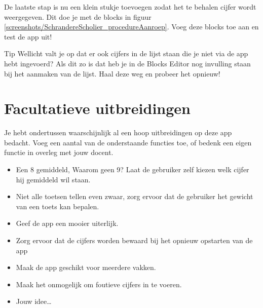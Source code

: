 De laatste stap is nu een klein stukje toevoegen zodat het te behalen cijfer wordt weergegeven. Dit doe je met de blocks in figuur \ref{screenshots/SchrandereScholier_procedureAanroep}. \runOpTelefoon{} Voeg deze blocks toe aan  en test de app uit!

\begin{derivation}{Tip}
Wellicht valt je op dat er ook cijfers in de lijst staan die je niet via de app hebt ingevoerd? Als dit zo is dat heb je in de Blocks Editor nog invulling staan bij het aanmaken van de lijst. Haal deze weg en probeer het opnieuw!
\end{derivation}

\section{Facultatieve uitbreidingen}
Je hebt ondertussen waarschijnlijk al een hoop uitbreidingen op deze app bedacht. Voeg een aantal van de onderstaande functies toe, of bedenk een eigen functie in overleg met jouw docent.

\begin{itemize}
  \item Een 8 gemiddeld, Waarom geen 9? Laat de gebruiker zelf kiezen welk cijfer hij gemiddeld wil staan.
  \item Niet alle toetsen tellen even zwaar, zorg ervoor dat de gebruiker het gewicht van een toets kan bepalen.
  \item Geef de app een mooier uiterlijk.
  \item Zorg ervoor dat de cijfers worden bewaard bij het opnieuw opstarten van de app
  \item Maak de app geschikt voor meerdere vakken.
  \item Maak het onmogelijk om foutieve cijfers in te voeren.
  \item Jouw idee\dots
\end{itemize}